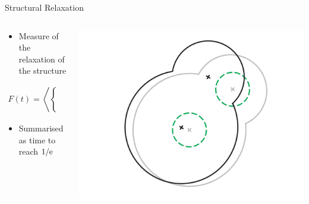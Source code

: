 \documentclass[16pt, aspectratio=43,compress]{beamer}
\begin{document}
\begin{frame}{Structural Relaxation}
    \begin{columns}
        \begin{column}{0.5\linewidth}
            \begin{itemize}
                \item Measure of the relaxation of the structure
            \end{itemize}
            \begin{align*}
                F(t) = \left \langle \begin{cases}
                    \quad0 &\text{if}\quad \delta  > 0.3 \\
                    \quad1 &\text{if}\quad \delta \leq 0.3
                \end{cases} \quad \right \rangle
            \end{align*}
            \begin{itemize}
                \item Summarised as time to reach $1/\text{e}$
            \end{itemize}
        \end{column}
        \begin{column}{0.5\linewidth}
            \centering
            \includegraphics[width=\textwidth]{struct}
        \end{column}
    \end{columns}
\end{frame}
\end{document}
